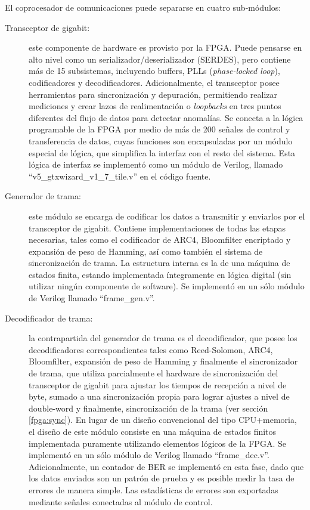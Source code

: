 El coprocesador de comunicaciones puede separarse en cuatro sub-módulos:

\begin{description}
 \item[Transceptor de gigabit:] este componente de hardware es provisto por la FPGA. Puede pensarse en alto nivel como un serializador/deserializador (SERDES), pero contiene más de 15 subsistemas, incluyendo buffers, PLLs (\textit{phase-locked loop}), codificadores y decodificadores. Adicionalmente, el transceptor posee herramientas para sincronización y depuración, permitiendo realizar mediciones y crear lazos de realimentación o \textit{loopbacks} en tres puntos diferentes del flujo de datos para detectar anomalías. Se conecta a la lógica programable de la FPGA por medio de más de 200 señales de control y transferencia de datos, cuyas funciones son encapsuladas por un módulo especial de lógica, que simplifica la interfaz con el resto del sistema. Esta lógica de interfaz se implementó como un módulo de Verilog, llamado ``v5\_gtxwizard\_v1\_7\_tile.v'' en el código fuente.

 \item[Generador de trama:] este módulo se encarga de codificar los datos a transmitir y enviarlos por el transceptor de gigabit. Contiene implementaciones de todas las etapas necesarias, tales como el codificador de ARC4, Bloomfilter encriptado y expansión de peso de Hamming, así como también el sistema de sincronización de trama. La estructura interna es la de una máquina de estados finita, estando implementada íntegramente en lógica digital (sin utilizar ningún componente de software). Se implementó en un sólo módulo de Verilog llamado ``frame\_gen.v''.
 
 \item[Decodificador de trama:] la contrapartida del generador de trama es el decodificador, que posee los decodificadores correspondientes tales como Reed-Solomon, ARC4, Bloomfilter, expansión de peso de Hamming y finalmente el sincronizador de trama, que utiliza parcialmente el hardware de sincronización del transceptor de gigabit para ajustar los tiempos de recepción a nivel de byte, sumado a una sincronización propia para lograr ajustes a nivel de double-word y finalmente, sincronización de la trama (ver sección \ref{fpga:sync}). En lugar de un diseño convencional del tipo CPU+memoria, el diseño de este módulo consiste en una máquina de estados finitos implementada puramente utilizando elementos lógicos de la FPGA. Se implementó en un sólo módulo de Verilog llamado ``frame\_dec.v''. Adicionalmente, un contador de BER se implementó en esta fase, dado que los datos enviados son un patrón de prueba y es posible medir la tasa de errores de manera simple. Las estadísticas de errores son exportadas mediante señales conectadas al módulo de control.
 
 \end{description}

